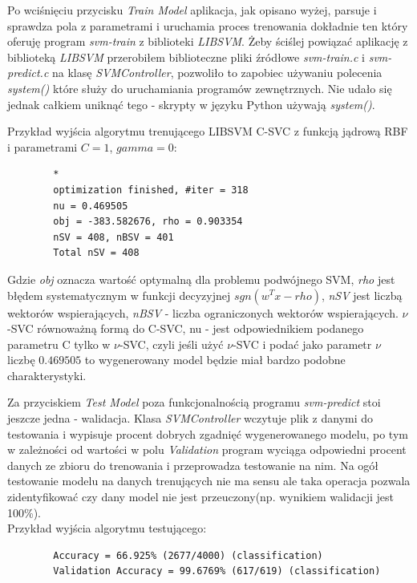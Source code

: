 \documentclass[paper=a4, fontsize=11pt]{scrartcl} %
\numberwithin{equation}{section} %
\numberwithin{figure}{section} %
\begin{document}
    \par Po wciśnięciu przycisku \textit{Train Model} aplikacja, jak opisano wyżej,
    parsuje i sprawdza pola z parametrami i uruchamia proces trenowania dokładnie ten który
    oferuję program \textit{svm-train} z biblioteki \textit{LIBSVM}. Żeby ściślej powiązać
    aplikację z biblioteką \textit{LIBSVM} przerobiłem biblioteczne pliki źródłowe
    \textit{svm-train.c} i \textit{svm-predict.c} na klasę \textit{SVMController}, pozwoliło to
    zapobiec używaniu polecenia \textit{system()} które służy do uruchamiania programów
    zewnętrznych. Nie udało się jednak całkiem uniknąć tego - skrypty w języku Python używają
    \textit{system()}.

    Przykład wyjścia algorytmu trenującego LIBSVM C-SVC z funkcją jądrową RBF i parametrami
    $C=1$, $gamma=0$:

    \begin{verbatim}
        *
        optimization finished, #iter = 318
        nu = 0.469505
        obj = -383.582676, rho = 0.903354
        nSV = 408, nBSV = 401
        Total nSV = 408
    \end{verbatim}

    \par Gdzie \textit{obj} oznacza wartość optymalną dla problemu podwójnego SVM, \textit{rho}
    jest błędem systematycznym w funkcji decyzyjnej $sgn(w^{T}x - rho)$, \textit{nSV} jest
    liczbą wektorów wspierających, \textit{nBSV} - liczba ograniczonych  wektorów
    wspierających. $\nu$-SVC równoważną formą do C-SVC, nu - jest odpowiednikiem podanego
    parametru C tylko w $\nu$-SVC, czyli jeśli użyć $\nu$-SVC i podać jako parametr $\nu$
    liczbę $0.469505$ to wygenerowany model będzie miał bardzo podobne charakterystyki.

    \par Za przyciskiem \textit{Test Model} poza funkcjonalnością programu \textit{svm-predict}
    stoi jeszcze jedna - walidacja. Klasa \textit{SVMController} wczytuje plik z danymi do
    testowania i wypisuje procent dobrych zgadnięć wygenerowanego modelu, po tym w zależności
    od wartości w polu \textit{Validation} program wyciąga odpowiedni procent danych ze zbioru
    do trenowania i przeprowadza testowanie na nim. Na ogół testowanie modelu na danych
    trenujących nie ma sensu ale taka operacja pozwala zidentyfikować czy dany model nie jest
    przeuczony(np. wynikiem walidacji jest 100\%). \\

    Przykład wyjścia algorytmu testującego:
    \begin{verbatim}
        Accuracy = 66.925% (2677/4000) (classification)
        Validation Accuracy = 99.6769% (617/619) (classification)
    \end{verbatim}
\end{document}
